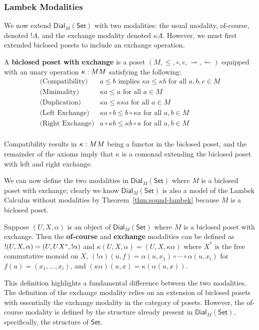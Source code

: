 \documentclass{entcs}
\let\to\relax                   %
\newcommand{\to}{\rightarrow}
\newcommand{\rto}{\leftharpoonup}
\newcommand{\lto}{\rightharpoonup}
\newcommand{\Set}{\mathsf{Set}}
\newcommand{\Dial}[2]{\mathsf{Dial}_{#1}(#2)}
\begin{document}
\subsubsection{Lambek Modalities}
\label{subsec:modalities}
We now extend $\Dial{M}{\Set}$ with two modalities: the usual
modality, of-course, denoted $!A$, and the exchange modality denoted
$\kappa A$.  However, we must first extended biclosed posets to
include an exchange operation.

\begin{definition}
  \label{def:biclosed-exchange}
  A \textbf{biclosed poset with exchange} is a poset $(M, \leq, \circ,
  e, \lto, \rto)$ equipped with an unary operation $\kappa : M \to M$
  satisfying the following:
  \[
  \begin{array}{clr}
    \text{(Compatibility)} & a \leq b \text{ implies } \kappa a \leq \kappa b \text{ for all } a,b,c \in M\\
    \text{(Minimality)} & \kappa a \leq a \text{ for all } a \in M\\
    \text{(Duplication)} & \kappa a \leq \kappa\kappa a \text{ for all } a \in M\\
    \text{(Left Exchange)} & \kappa a \circ b \leq b \circ \kappa a \text{ for all } a, b \in M\\
    \text{(Right Exchange)} & a \circ \kappa b \leq \kappa b \circ a \text{ for all } a, b \in M\\
  \end{array}
  \]
\end{definition}
\noindent
Compatibility results in $\kappa : M \to M$ being a functor in the
biclosed poset, and the remainder of the axioms imply that $\kappa$ is
a comonad extending the biclosed poset with left and right exchange.

We can now define the two modalities in $\Dial{M}{\Set}$ where $M$ is
a biclosed poset with exchange; clearly we know $\Dial{M}{\Set}$ is
also a model of the Lambek Calculus without modalities by
Theorem~\ref{thm:sound-lambek} because $M$ is a biclosed poset.
\begin{definition}
  \label{def:modalities-dial}
  Suppose $(U, X, \alpha)$ is an object of $\Dial{M}{\Set}$ where $M$
  is a biclosed poset with exchange. Then the \textbf{of-course} and
  \textbf{exchange} modalities can be defined as 
  $! (U, X, \alpha) = (U, U \to X^*, !\alpha)$ and
  $\kappa (U, X, \alpha) = (U, X, \kappa \alpha)$
  where $X^*$ is the free commutative monoid on $X$, $(!\alpha)(u, f)
  = \alpha(u, x_1) \circ \cdots \circ \alpha(u, x_i)$ for $f(u) =
  (x_1, \ldots, x_i)$, and $(\kappa \alpha)(u, x) = \kappa (\alpha(u,
  x))$.
\end{definition}
This definition highlights a fundamental difference between the two
modalities.  The definition of the exchange modality relies on an
extension of biclosed posets with essentially the exchange modality in
the category of posets.  However, the of-course modality is defined by
the structure already present in $\Dial{M}{\Set}$, specifically, the
structure of $\Set$.
\end{document}

